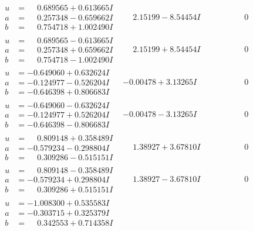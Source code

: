 \documentclass[1p]{elsarticle_modified}
\theoremstyle{definition}
\begin{document}
$$\begin{array}{c|c|c}
\begin{aligned}
u &= \phantom{-}0.689565 + 0.613665 I \\
a &= \phantom{-}0.257348 - 0.659662 I \\
b &= \phantom{-}0.754718 + 1.002490 I\end{aligned}
 & \phantom{-}2.15199 - 8.54454 I & \phantom{-0.000000 } 0 \\ \hline\begin{aligned}
u &= \phantom{-}0.689565 - 0.613665 I \\
a &= \phantom{-}0.257348 + 0.659662 I \\
b &= \phantom{-}0.754718 - 1.002490 I\end{aligned}
 & \phantom{-}2.15199 + 8.54454 I & \phantom{-0.000000 } 0 \\ \hline\begin{aligned}
u &= -0.649060 + 0.632624 I \\
a &= -0.124977 - 0.526204 I \\
b &= -0.646398 + 0.806683 I\end{aligned}
 & -0.00478 + 3.13265 I & \phantom{-0.000000 } 0 \\ \hline\begin{aligned}
u &= -0.649060 - 0.632624 I \\
a &= -0.124977 + 0.526204 I \\
b &= -0.646398 - 0.806683 I\end{aligned}
 & -0.00478 - 3.13265 I & \phantom{-0.000000 } 0 \\ \hline\begin{aligned}
u &= \phantom{-}0.809148 + 0.358489 I \\
a &= -0.579234 - 0.298804 I \\
b &= \phantom{-}0.309286 - 0.515151 I\end{aligned}
 & \phantom{-}1.38927 + 3.67810 I & \phantom{-0.000000 } 0 \\ \hline\begin{aligned}
u &= \phantom{-}0.809148 - 0.358489 I \\
a &= -0.579234 + 0.298804 I \\
b &= \phantom{-}0.309286 + 0.515151 I\end{aligned}
 & \phantom{-}1.38927 - 3.67810 I & \phantom{-0.000000 } 0 \\ \hline\begin{aligned}
u &= -1.008300 + 0.535583 I \\
a &= -0.303715 + 0.325379 I \\
b &= \phantom{-}0.342553 + 0.714358 I\end{aligned}

\end{array}$$
\end{document}

